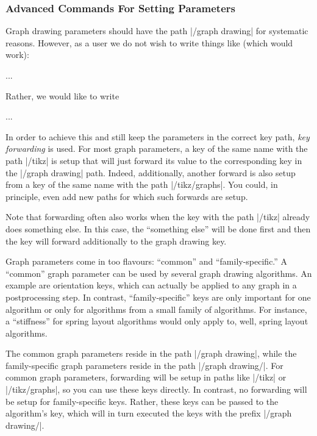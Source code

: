 \subsubsection{Advanced Commands For Setting Parameters}

Graph drawing parameters should have the path
|/graph drawing| for systematic reasons. However, as a user we do not
wish to write things like (which would work):
\begin{codeexample}
\tikz [/graph drawing/algorithm=my algorithm,
       /graph drawing/my algorithm/foo=bar,  
       /graph drawing/blub=foobar] ...
\end{codeexample}
Rather, we would like to write
\begin{codeexample}
\tikz [my algorithm={foo=bar}, blub=foobar] ...
\end{codeexample}


In order to achieve this and still keep the parameters in the correct
key path, \emph{key forwarding} is used. For most graph parameters, a
key of the same name with the path |/tikz| is setup that will just
forward its value to the corresponding key in the |/graph drawing|
path. Indeed, additionally, another forward is also setup from a key
of the same name with the path |/tikz/graphs|. You could, in
principle, even add new paths for which such forwards are setup.

Note that forwarding often also works when the key with the path
|/tikz| already does something else. In this case, the ``something
else'' will be done first and then the key will forward additionally
to the graph drawing key.

Graph parameters come in too flavours: ``common'' and
``family-specific.'' A ``common'' graph parameter can be used by
several graph drawing algorithms. An example are orientation keys,
which can actually be applied to any graph in a postprocessing
step. In contrast, ``family-specific'' keys are only important for
one algorithm or only for algorithms from a small family of
algorithms. For instance, a ``stiffness'' for spring layout algorithms 
would only apply to, well, spring layout algorithms.

The common graph parameters reside in the path |/graph drawing|,
while the family-specific graph parameters reside in the path
|/graph drawing/|. For common graph parameters,
forwarding will be setup in paths like |/tikz| or |/tikz/graphs|, so
you can use these keys directly. In contrast, no forwarding will be
setup for family-specific keys. Rather, these keys can be passed to the
algorithm's key, which will in turn executed the keys with the
prefix |/graph drawing/|.

